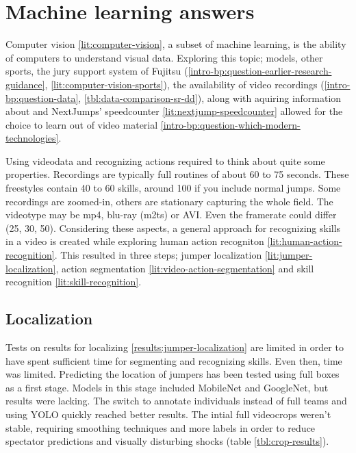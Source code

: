 \section{Machine learning answers}
\label{ch:machine-learning-answers}

Computer vision \ref{lit:computer-vision}, a subset of machine learning, is the ability of computers to understand visual data.
Exploring this topic; models, other sports, the jury support system of Fujitsu (\ref{intro-bp:question-earlier-research-guidance}, \ref{lit:computer-vision-sports}), the availability of video recordings (\ref{intro-bp:question-data}, \ref{tbl:data-comparison-sr-dd}), along with aquiring information about and NextJumps' speedcounter \ref{lit:nextjump-speedcounter} allowed for the choice to learn out of video material \ref{intro-bp:question-which-modern-technologies}.

Using videodata and recognizing actions required to think about quite some properties. Recordings are typically full routines of about 60 to 75 seconds. These freestyles contain 40 to 60 skills, around 100 if you include normal jumps. Some recordings are zoomed-in, others are stationary capturing the whole field. The videotype may be mp4, blu-ray (m2ts) or AVI. Even the framerate could differ (25, 30, 50).
Considering these aspects, a general approach for recognizing skills in a video is created while exploring human action recogniton \ref{lit:human-action-recognition}. This resulted in three steps; jumper localization \ref{lit:jumper-localization}, action segmentation \ref{lit:video-action-segmentation} and skill recognition \ref{lit:skill-recognition}.


\subsection{Localization}

Tests on results for localizing \ref{results:jumper-localization} are limited in order to have spent sufficient time for segmenting and recognizing skills. Even then, time was limited. Predicting the location of jumpers has been tested using full boxes as a first stage. Models in this stage included MobileNet and GoogleNet, but results were lacking. The switch to annotate individuals instead of full teams and using YOLO quickly reached better results. The intial full videocrops weren't stable, requiring smoothing techniques and more labels in order to reduce spectator predictions and visually disturbing shocks (table \ref{tbl:crop-results}).

